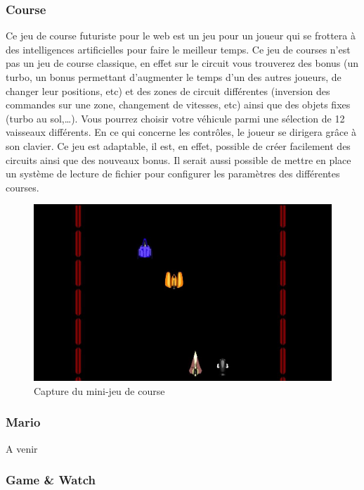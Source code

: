 \subsubsection{Course}

Ce jeu de course futuriste pour le web est un jeu pour un joueur qui se frottera à des intelligences artificielles pour faire le meilleur temps. 
Ce jeu de courses n’est pas un jeu de course classique, en effet sur le circuit vous trouverez des bonus 
(un turbo, un bonus permettant d’augmenter le temps d’un des autres joueurs, de changer leur positions, etc) 
et des zones de circuit différentes (inversion des commandes sur une zone, changement de vitesses, etc) 
ainsi que des objets fixes (turbo au sol,…). Vous pourrez choisir votre véhicule parmi une sélection de 12 vaisseaux différents. 
 En ce qui concerne les contrôles, le joueur se dirigera grâce à son clavier. Ce jeu est adaptable, il est, en effet, 
possible de créer facilement des circuits ainsi que des nouveaux bonus. Il serait aussi possible de mettre en place un système de 
lecture de fichier pour configurer les paramètres des différentes courses.

\begin{figure}
 \includegraphics[width=\linewidth]{img/capturejeu_course}
 \caption{Capture du mini-jeu de course}
 \label{fig:game_course}
\end{figure}

\subsubsection{Mario}

A venir

\subsubsection{Game \& Watch}

